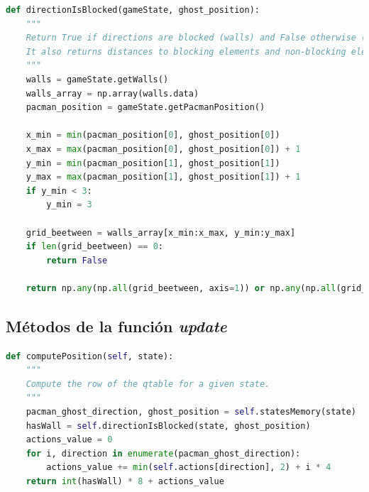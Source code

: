 \documentclass[11pt]{exam}
\begin{document}
\begin{lstlisting}[caption={Función directionIsBlocked.}, label={directionIsBlocked}, language=python, basicstyle=\footnotesize]
def directionIsBlocked(gameState, ghost_position):
	"""
	Return True if directions are blocked (walls) and False otherwise (no walls).
	It also returns distances to blocking elements and non-blocking elements.
	"""
	walls = gameState.getWalls()
	walls_array = np.array(walls.data)
	pacman_position = gameState.getPacmanPosition()
	
	x_min = min(pacman_position[0], ghost_position[0])
	x_max = max(pacman_position[0], ghost_position[0]) + 1
	y_min = min(pacman_position[1], ghost_position[1])
	y_max = max(pacman_position[1], ghost_position[1]) + 1
	if y_min < 3:
		y_min = 3
	
	grid_beetween = walls_array[x_min:x_max, y_min:y_max]
	if len(grid_beetween) == 0:
		return False
	
	return np.any(np.all(grid_beetween, axis=1)) or np.any(np.all(grid_beetween, axis=0))
\end{lstlisting}

\subsection{Métodos de la función \textit{update}}\label{apendice_update}

\begin{lstlisting}[caption={Función computePosition.}, label={computePosition}, language=python, basicstyle=\footnotesize]
def computePosition(self, state):
	"""
	Compute the row of the qtable for a given state.
	"""
	pacman_ghost_direction, ghost_position = self.statesMemory(state)
	hasWall = self.directionIsBlocked(state, ghost_position)
	actions_value = 0
	for i, direction in enumerate(pacman_ghost_direction):
		actions_value += min(self.actions[direction], 2) + i * 4
	return int(hasWall) * 8 + actions_value
\end{lstlisting}
\end{document}
